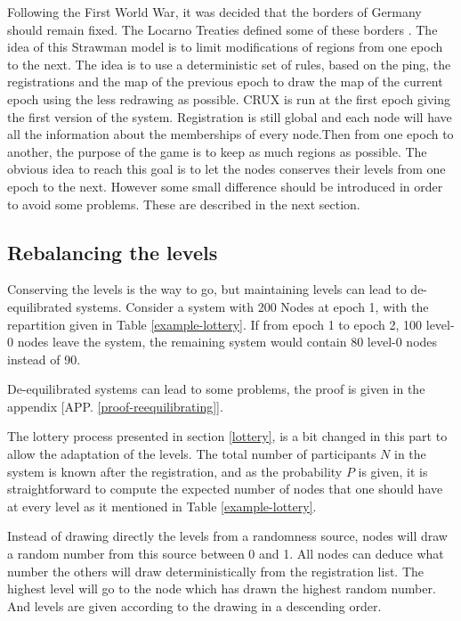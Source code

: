 \documentclass[a4paper,11pt,oneside]{report}
\begin{document}
Following the First World War, it was decided that the borders of Germany
should remain fixed. The Locarno Treaties defined some of these borders
\cite{LocarnoTreaties TODO}. The idea of this Strawman model is to limit
modifications of regions from one epoch to the next. The idea is to use a
deterministic set of rules, based on the ping, the registrations and the map of
the previous epoch to draw the map of the current epoch using the less
redrawing as possible. CRUX is run at the first epoch giving the first version
of the system. Registration is still global and each node will have all the
information about the memberships of every node.Then from one epoch to another,
the purpose of the game is to keep as much regions as possible. The obvious
idea to reach this goal is to let the nodes conserves their levels from one
epoch to the next.  However some small difference should be introduced in order
to avoid some problems.  These are described in the next section.

\subsection{Rebalancing the levels} \label{rebalancing}
Conserving the levels is the way to go, but maintaining levels can lead to
de-equilibrated systems. Consider a system with 200 Nodes at epoch 1, with the
repartition given in Table \ref{example-lottery}. If from epoch 1 to epoch 2,
100 level-0 nodes leave the system, the remaining system would contain 80
level-0 nodes instead of 90. 

De-equilibrated systems can lead to some problems, the proof is given in the
appendix [APP. \ref{proof-reequilibrating}].

The lottery process presented in section \ref{lottery}, is a bit changed in
this part to allow the adaptation of the levels. The total number of
participants $N$ in the system is known after the registration, and as the
probability $P$ is given, it is straightforward to compute the expected number
of nodes that one should have at every level as it mentioned in Table
\ref{example-lottery}. 

Instead of drawing directly the levels from a randomness source, nodes will
draw a random number from this source between 0 and 1.  All nodes can deduce
what number the others will draw deterministically from the registration list.
The highest level will go to the node which has drawn the highest random
number.  And levels are given according to the drawing in a descending order.  
\end{document}
